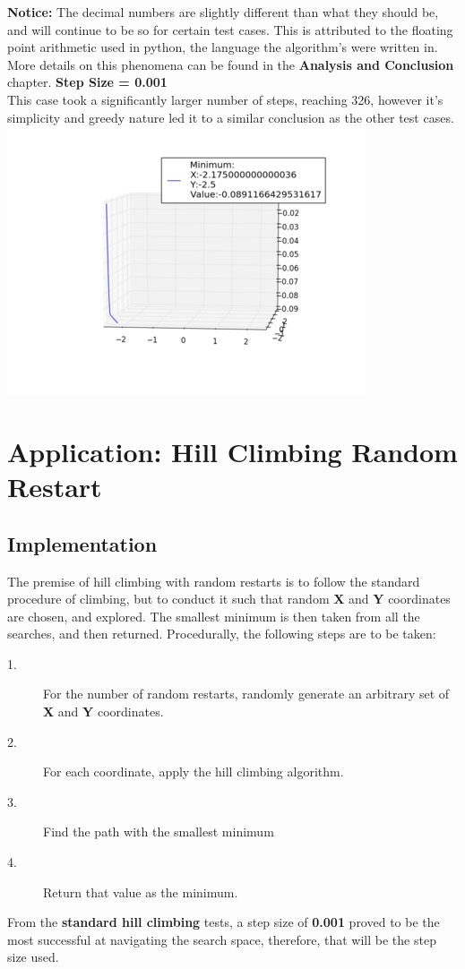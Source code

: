 \documentclass[]{report}
\begin{document}
	\textbf{Notice:} The decimal numbers are slightly different than what they should be, and will continue to be so for certain test cases. This is attributed to the floating point arithmetic used in python, the language the algorithm's were written in. More details on this phenomena can be found in the \textbf{Analysis and Conclusion} chapter.\newpage
	\textbf{Step Size = 0.001}\\
	This case took a significantly larger number of steps, reaching 326, however it's simplicity and greedy nature led it to a similar conclusion as the other test cases.\\
	\includegraphics{hc0001}
	
	\chapter{Application: Hill Climbing Random Restart}
	\section{Implementation}
	The premise of hill climbing with random restarts is to follow the standard procedure of climbing, but to conduct it such that random \textbf{X} and \textbf{Y} coordinates are chosen, and explored. The smallest minimum is then taken from all the searches, and then returned. Procedurally, the following steps are to be taken:
	\begin{description}
		\item[1.] For the number of random restarts, randomly generate an arbitrary set of \textbf{X} and \textbf{Y} coordinates.
		\item[2.] For each coordinate, apply the hill climbing algorithm.
		\item[3.] Find the path with the smallest minimum
		\item[4.] Return that value as the minimum.
	\end{description}
	From the \textbf{standard hill climbing} tests, a step size of \textbf{0.001} proved to be the most successful at navigating the search space, therefore, that will be the step size used.\\
	\newpage
\end{document}
